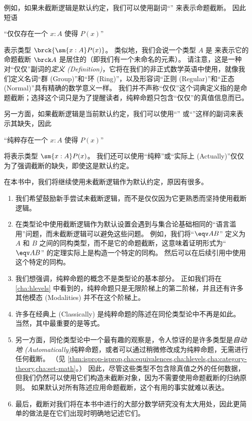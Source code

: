 例如，如果未截断逻辑是默认约定，我们可以使用副词“”
%
来表示命题截断。
因此短语
\begin{center}
  “仅仅存在一个 $x:A$ 使得 $P(x)$”
\end{center}
表示类型 $\brck{\sm{x:A} P(x)}$。
类似地，我们会说一个类型 $A$ 是
%
%
来表示它的命题截断 $\brck A$ 是居住的（即我们有一个未命名的元素）。
请注意，这是一种对“仅仅”副词的\emph{定义 (Definition)}，它将在我们的非正式数学英语中使用，就像我们定义名词“群 (Group)”和“环 (Ring)”，以及形容词“正则 (Regular)”和“正态 (Normal)”具有精确的数学意义一样。
我们并不声称“仅仅”这个词典定义指的是命题截断；选择这个词只是为了提醒读者，纯粹命题只包含“仅仅”的真值信息而已。

另一方面，如果截断逻辑是当前默认约定，我们可以使用“”
%
或“”这样的副词来表示其缺失，因此
\begin{center}
  “纯粹存在一个 $x:A$ 使得 $P(x)$”
\end{center}
将表示类型 $\sm{x:A} P(x)$。
我们还可以使用“纯粹”或“实际上 (Actually)”仅仅为了强调截断的缺失，即使这是默认约定。

在本书中，我们将继续使用未截断逻辑作为默认约定，原因有很多。
\begin{enumerate}[label=(\arabic*)]
  \item 我们希望鼓励新手尝试未截断逻辑，而不是仅仅因为它更熟悉而坚持使用截断逻辑。
  \item 在类型论中使用截断逻辑作为默认设置会遇到与集合论基础相同的“语言滥用”问题，而未截断逻辑可以避免这些问题。
  例如，我们将“$\eqv A B$” 定义为 $A$ 和 $B$ 之间的同构类型，而不是它的命题截断，这意味着证明形式为“$\eqv A B$” 的定理实际上是构造一个特定的同构。
  然后可以在后续引用中使用这个特定的同构。
  \item 我们想强调，纯粹命题的概念不是类型论的基本部分。
  正如我们将在 \cref{cha:hlevels} 中看到的，纯粹命题只是无限阶梯上的第二阶梯，并且还有许多其他模态 (Modalities) 并不在这个阶梯上。
  \item 许多在经典上 (Classically) 是纯粹命题的陈述在同伦类型论中不再是如此。
  当然，其中最重要的是等式。
  \item 另一方面，同伦类型论中一个最有趣的观察是，令人惊讶的是许多类型是\emph{自动地 (Automatically)}纯粹命题，或者可以通过稍微修改成为纯粹命题，无需进行任何截断。
  （见 \cref{thm:isprop-isprop,cha:equivalences,cha:hlevels,cha:category-theory,cha:set-math}。）
  因此，尽管这些类型不包含除真值之外的任何数据，但我们仍然可以使用它们构造未截断对象，因为不需要使用命题截断的归纳原则。
  如果默认对所有陈述应用命题截断，这个有用的事实就难以表达。
  \item 最后，截断对我们将在本书中进行的大部分数学研究没有太大用处，因此更简单的做法是在它们出现时明确地记述它们。
\end{enumerate}

